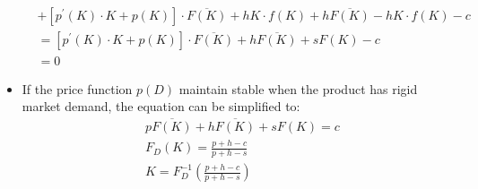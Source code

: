 \documentclass{article}
\theoremstyle{definition}
\theoremstyle{definition}
\theoremstyle{remark}
\begin{document}
\begin{itemize}
\begin{equation*}
\begin{aligned}
		&+[p^{'}(K)\cdot K+p(K)]\cdot \overline{F(K)}+hK\cdot f(K)+h\overline{F(K)}-hK\cdot f(K)-c \\
		&=[p^{'}(K)\cdot K+p(K)]\cdot \overline{F(K)}+h\overline{F(K)}+sF(K)-c \\
		&=0
\end{aligned}
\end{equation*}
\item If the price function $p(D)$ maintain stable when the product has rigid market demand, the equation can be simplified to:
\begin{equation*}
\begin{aligned}
	& p\overline{F(K)}+h\overline{F(K)}+sF(K)=c \\
	& F_D(K)=\frac{p+h-c}{p+h-s} \\
	& K=F_D^{-1}(\frac{p+h-c}{p+h-s})
\end{aligned}
\end{equation*}
\end{itemize}
\end{document}
